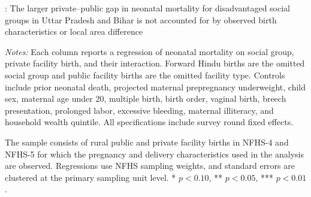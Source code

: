 \documentclass[12pt]{article}
\begin{document}
\begin{landscape}
    
\renewcommand{\arraystretch}{0.7}
\setlength{\tabcolsep}{12pt}


\begin{table}[H]
    \centering
    \caption{
        : The larger private–public gap in neonatal mortality for disadvantaged social groups in Uttar Pradesh and Bihar is not accounted for by observed birth characteristics or local area difference
    }
    \label{tab:nnm_interactions}

    \vspace{0.4em}

    \begin{threeparttable}

        \begin{adjustbox}{max width=\textwidth}
        \scriptsize
            
        \end{adjustbox}

\begin{minipage}{0.92\textwidth}
\scriptsize
\vspace{0.5em}
\textit{Notes:}
Each column reports a regression of neonatal mortality on social group, private facility birth, and their interaction. Forward Hindu births are the omitted social group and public facility births are the omitted facility type. Controls include prior neonatal death, projected maternal prepregnancy underweight, child sex, maternal age under 20, multiple birth, birth order, vaginal birth, breech presentation, prolonged labor, excessive bleeding, maternal illiteracy, and household wealth quintile. All specifications include survey round fixed effects. 

The sample consists of rural public and private facility births in NFHS-4 and NFHS-5 for which the pregnancy and delivery characteristics used in the analysis are observed. Regressions use NFHS sampling weights, and standard errors are clustered at the primary sampling unit level. * $p<0.10$, ** $p<0.05$, *** $p<0.01$.
\end{minipage}

    \end{threeparttable}
\end{table}

\setlength{\tabcolsep}{6pt}
\renewcommand{\arraystretch}{1}


\end{landscape}
\end{document}
